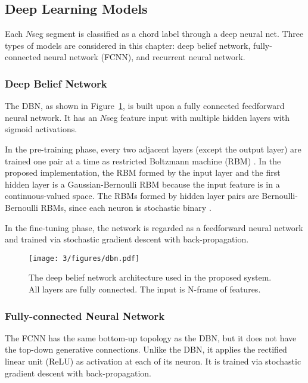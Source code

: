 \subsection{Deep Learning Models} \label{sec:3-dlmodel}

Each $N$seg segment is classified as a chord label through a deep neural net. Three types of models are considered in this chapter: deep belief network, fully-connected neural network (FCNN), and recurrent neural network.

\subsubsection{Deep Belief Network}

The DBN, as shown in Figure~\ref{fig:3-dbn}, is built upon a fully connected feedforward neural network. It has an $N$seg feature input with multiple hidden layers with sigmoid activations.

In the pre-training phase, every two adjacent layers (except the output layer) are trained one pair at a time as restricted Boltzmann machine (RBM) \cite{hinton2006fast}. In the proposed implementation, the RBM formed by the input layer and the first hidden layer is a Gaussian-Bernoulli RBM because the input feature is in a continuous-valued space. The RBMs formed by hidden layer pairs are Bernoulli-Bernoulli RBMs, since each neuron is stochastic binary \cite{hinton2006reducing}.

In the fine-tuning phase, the network is regarded as a feedforward neural network and trained via stochastic gradient descent with back-propagation.

\begin{figure}[htb]
\centering
\texttt{[image: 3/figures/dbn.pdf]}
\caption{The deep belief network architecture used in the proposed system. All layers are fully connected. The input is N-frame of features.}
\label{fig:3-dbn}
\end{figure}

\subsubsection{Fully-connected Neural Network}

The FCNN has the same bottom-up topology as the DBN, but it does not have the top-down generative connections. Unlike the DBN, it applies the rectified linear unit (ReLU) as activation at each of its neuron. It is trained via stochastic gradient descent with back-propagation.

